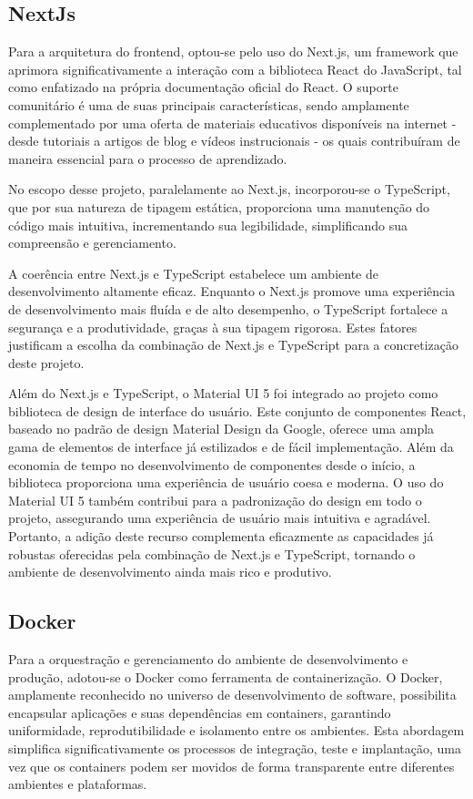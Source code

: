 \subsection{NextJs}
Para a arquitetura do frontend, optou-se pelo uso do Next.js, um framework que aprimora significativamente a interação com a biblioteca React do JavaScript, tal como enfatizado na própria documentação oficial do React. O suporte comunitário é uma de suas principais características, sendo amplamente complementado por uma oferta de materiais educativos disponíveis na internet - desde tutoriais a artigos de blog e vídeos instrucionais - os quais contribuíram de maneira essencial para o processo de aprendizado.

No escopo desse projeto, paralelamente ao Next.js, incorporou-se o TypeScript, que por sua natureza de tipagem estática, proporciona uma manutenção do código mais intuitiva, incrementando sua legibilidade, simplificando sua compreensão e gerenciamento.

A coerência entre Next.js e TypeScript estabelece um ambiente de desenvolvimento altamente eficaz. Enquanto o Next.js promove uma experiência de desenvolvimento mais fluída e de alto desempenho, o TypeScript fortalece a segurança e a produtividade, graças à sua tipagem rigorosa. Estes fatores justificam a escolha da combinação de Next.js e TypeScript para a concretização deste projeto.

Além do Next.js e TypeScript, o Material UI 5 foi integrado ao projeto como biblioteca de design de interface do usuário. Este conjunto de componentes React, baseado no padrão de design Material Design da Google, oferece uma ampla gama de elementos de interface já estilizados e de fácil implementação. Além da economia de tempo no desenvolvimento de componentes desde o início, a biblioteca proporciona uma experiência de usuário coesa e moderna. O uso do Material UI 5 também contribui para a padronização do design em todo o projeto, assegurando uma experiência de usuário mais intuitiva e agradável. Portanto, a adição deste recurso complementa eficazmente as capacidades já robustas oferecidas pela combinação de Next.js e TypeScript, tornando o ambiente de desenvolvimento ainda mais rico e produtivo.

\subsection{Docker}
Para a orquestração e gerenciamento do ambiente de desenvolvimento e produção, adotou-se o Docker como ferramenta de containerização. O Docker, amplamente reconhecido no universo de desenvolvimento de software, possibilita encapsular aplicações e suas dependências em containers, garantindo uniformidade, reprodutibilidade e isolamento entre os ambientes. Esta abordagem simplifica significativamente os processos de integração, teste e implantação, uma vez que os containers podem ser movidos de forma transparente entre diferentes ambientes e plataformas.


